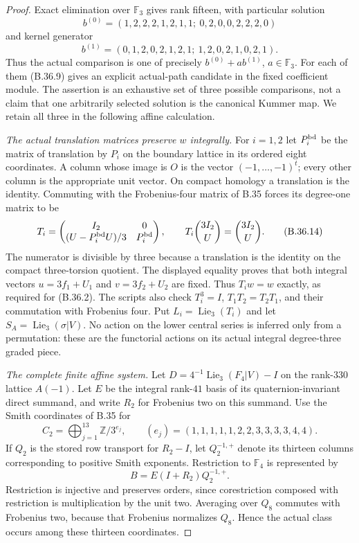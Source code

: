 \begin{proof}
Exact elimination over $\mathbb F_3$ gives rank fifteen,
with particular solution
\[
 b^{(0)}=(1,2,2,2,1,2,1,1;\ 0,2,0,0,2,2,2,0)
\]
and kernel generator
\[
 b^{(1)}=(0,1,2,0,2,1,2,1;\ 1,2,0,2,1,0,2,1).
                                                               \tag{B.36.13}
\]
Thus the actual comparison is one of precisely
$b^{(0)}+a b^{(1)}$, $a\in\mathbb F_3$.
For each of them (B.36.9) gives an explicit actual-path
candidate in the fixed coefficient module.
The assertion is an exhaustive set of three possible
comparisons, not a claim that one arbitrarily selected
solution is the canonical Kummer map.
We retain all three in the following affine calculation.


\emph{The actual translation matrices preserve $w$ integrally.}
For $i=1,2$ let $P_i^{\rm bd}$ be the matrix of translation
by $P_i$ on the boundary lattice in its ordered eight
coordinates. A column whose image is $O$ is the vector
$(-1,\ldots,-1)^t$; every other column is the appropriate
unit vector. On compact homology a translation is the
identity. Commuting with the Frobenius-four matrix of
B.35 forces its degree-one matrix to be
\[
 T_i=\begin{pmatrix}
 I_2&0\\ (U-P_i^{\rm bd}U)/3&P_i^{\rm bd}
 \end{pmatrix},\qquad
 T_i\binom{3I_2}{U}=\binom{3I_2}{U}.                         \tag{B.36.14}
\]
The numerator is divisible by three because a translation
is the identity on the compact three-torsion quotient.
The displayed equality proves that both integral vectors
$u=3f_1+U_1$ and $v=3f_2+U_2$ are fixed. Thus
$T_iw=w$ exactly, as required for (B.36.2).
The scripts also check $T_i^3=I$, $T_1T_2=T_2T_1$, and
their commutation with Frobenius four.
Put $L_i=\operatorname{Lie}_3(T_i)$ and let
$S_A=\operatorname{Lie}_3(\sigma|V)$.
No action on the lower central series is inferred only
from a permutation: these are the functorial actions on
its actual integral degree-three graded piece.

\emph{The complete finite affine system.}
Let $D=4^{-1}\operatorname{Lie}_3(F_4|V)-I$ on the
rank-$330$ lattice $A(-1)$. Let $E$ be the integral
rank-$41$ basis of its quaternion-invariant direct
summand, and write $R_2$ for Frobenius two on this
summand. Use the Smith coordinates of B.35 for
\[
 C_2=\bigoplus_{j=1}^{13}\mathbb Z/3^{e_j},\qquad
 (e_j)=(1,1,1,1,1,2,2,3,3,3,3,4,4).                          \tag{B.36.15}
\]
If $Q_2$ is the stored row transport for $R_2-I$, let
$Q_2^{-1,+}$ denote its thirteen columns corresponding
to positive Smith exponents. Restriction to
$\mathbb F_4$ is represented by
\[
                   B=E(I+R_2)Q_2^{-1,+}.                     \tag{B.36.16}
\]
Restriction is injective and preserves orders, since
corestriction composed with restriction is multiplication
by the unit two. Averaging over $Q_8$ commutes with Frobenius
two, because that Frobenius normalizes $Q_8$.
Hence the actual class occurs among these thirteen
coordinates.


\end{proof}
